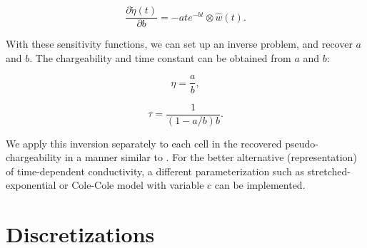 \documentclass[extra,mreferee]{gji}
\newcommand{\peta}{\tilde{\eta}}
\begin{document}
\begin{linenomath*}
\begin{equation}
  \frac{\partial \peta(t)}{\partial b} = -ate^{-bt} \otimes \hat{w}(t).
\end{equation}
\end{linenomath*}
With these sensitivity functions, we can set up an inverse problem, and recover $a$ and $b$.
The chargeability and time constant can be obtained from $a$ and $b$:
\begin{linenomath*}
\begin{equation}
  \eta =  \frac{a}{b},
\end{equation}
\end{linenomath*}
\begin{linenomath*}
\begin{equation}
  \tau =  \frac{1}{(1-a/b)b}.
\end{equation}
\end{linenomath*}
We apply this inversion separately to each cell in the recovered pseudo-chargeability  in a manner similar to \cite[]{Yuval1997}.
For the better alternative (representation) of time-dependent conductivity, a different parameterization such as stretched-exponential \cite[]{Kohlrausch1854} or Cole-Cole model with variable $c$ can be implemented.

\section{Discretizations}
\end{document}
